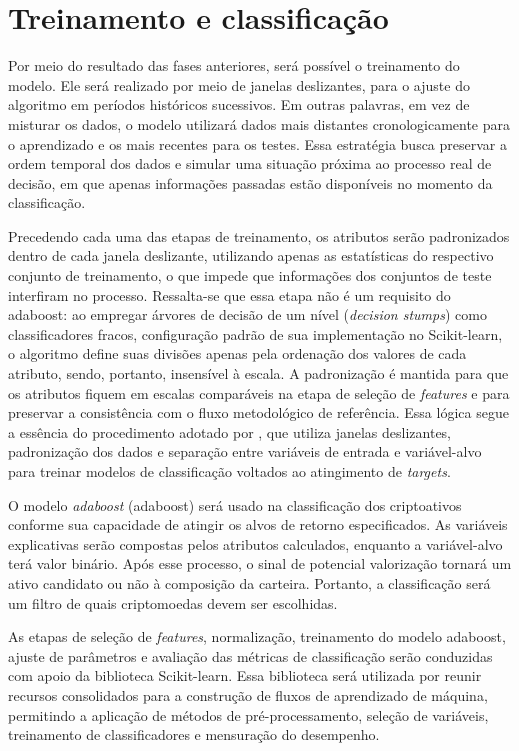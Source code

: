 \section{Treinamento e classificação}
\label{sec_treinamento_e_classificacao}

Por meio do resultado das fases anteriores, será possível o treinamento do modelo. Ele será realizado por meio de janelas deslizantes, para o ajuste do algoritmo em períodos históricos sucessivos. Em outras palavras, em vez de misturar os dados, o modelo utilizará dados mais distantes cronologicamente para o aprendizado e os mais recentes para os testes. Essa estratégia busca preservar a ordem temporal dos dados e simular uma situação próxima ao processo real de decisão, em que apenas informações passadas estão disponíveis no momento da classificação.

Precedendo cada uma das etapas de treinamento, os atributos serão padronizados dentro de cada janela deslizante, utilizando apenas as estatísticas do respectivo conjunto de treinamento, o que impede que informações dos conjuntos de teste interfiram no processo. Ressalta-se que essa etapa não é um requisito do \acs{adaboost}: ao empregar árvores de decisão de um nível (\textit{decision stumps}) como classificadores fracos, configuração padrão de sua implementação no Scikit-learn, o algoritmo define suas divisões apenas pela ordenação dos valores de cada atributo, sendo, portanto, insensível à escala. A padronização é mantida para que os atributos fiquem em escalas comparáveis na etapa de seleção de \textit{features} e para preservar a consistência com o fluxo metodológico de referência. Essa lógica segue a essência do procedimento adotado por , que utiliza janelas deslizantes, padronização dos dados e separação entre variáveis de entrada e variável-alvo para treinar modelos de classificação voltados ao atingimento de \textit{targets}.

O modelo \textit{\acl{adaboost}} (\acs{adaboost}) será usado na classificação dos criptoativos conforme sua capacidade de atingir os alvos de retorno especificados. As variáveis explicativas serão compostas pelos atributos calculados, enquanto a variável-alvo terá valor binário. Após esse processo, o sinal de potencial valorização tornará um ativo candidato ou não à composição da carteira. Portanto, a classificação será um filtro de quais criptomoedas devem ser escolhidas.

As etapas de seleção de \textit{features}, normalização, treinamento do modelo \acs{adaboost}, ajuste de parâmetros e avaliação das métricas de classificação serão conduzidas com apoio da biblioteca Scikit-learn. Essa biblioteca será utilizada por reunir recursos consolidados para a construção de fluxos de aprendizado de máquina, permitindo a aplicação de métodos de pré-processamento, seleção de variáveis, treinamento de classificadores e mensuração do desempenho.

